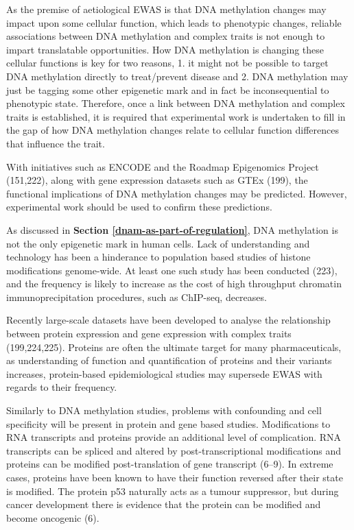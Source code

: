 \documentclass[11pt,oneside]{bristolthesis}
\begin{document}
As the premise of aetiological EWAS is that DNA methylation changes may impact upon some cellular function, which leads to phenotypic changes, reliable associations between DNA methylation and complex traits is not enough to impart translatable opportunities. How DNA methylation is changing these cellular functions is key for two reasons, 1. it might not be possible to target DNA methylation directly to treat/prevent disease and 2. DNA methylation may just be tagging some other epigenetic mark and in fact be inconsequential to phenotypic state. Therefore, once a link between DNA methylation and complex traits is established, it is required that experimental work is undertaken to fill in the gap of how DNA methylation changes relate to cellular function differences that influence the trait.

With initiatives such as ENCODE and the Roadmap Epigenomics Project (151,222), along with gene expression datasets such as GTEx (199), the functional implications of DNA methylation changes may be predicted. However, experimental work should be used to confirm these predictions.

As discussed in \textbf{Section \ref{dnam-as-part-of-regulation}}, DNA methylation is not the only epigenetic mark in human cells. Lack of understanding and technology has been a hinderance to population based studies of histone modifications genome-wide. At least one such study has been conducted (223), and the frequency is likely to increase as the cost of high throughput chromatin immunoprecipitation procedures, such as ChIP-seq, decreases.

Recently large-scale datasets have been developed to analyse the relationship between protein expression and gene expression with complex traits (199,224,225). Proteins are often the ultimate target for many pharmaceuticals, as understanding of function and quantification of proteins and their variants increases, protein-based epidemiological studies may supersede EWAS with regards to their frequency.

Similarly to DNA methylation studies, problems with confounding and cell specificity will be present in protein and gene based studies. Modifications to RNA transcripts and proteins provide an additional level of complication. RNA transcripts can be spliced and altered by post-transcriptional modifications and proteins can be modified post-translation of gene transcript (6--9). In extreme cases, proteins have been known to have their function reversed after their state is modified. The protein p53 naturally acts as a tumour suppressor, but during cancer development there is evidence that the protein can be modified and become oncogenic (6).
\end{document}

